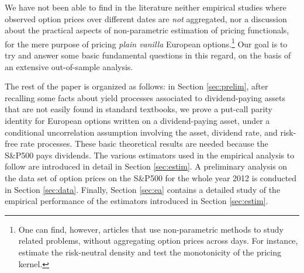 \documentclass[11pt]{article}
\theoremstyle{remark}
\begin{document}
We have not been able to find in the literature neither empirical
studies where observed option prices over different dates are
\emph{not} aggregated, nor a discussion about the practical aspects of
non-parametric estimation of pricing functionals, for the mere purpose
of pricing \emph{plain vanilla} European options.\footnote{One can
  find, however, articles that use non-parametric methods to study
  related problems, without aggregating option prices across days. For
  instance, \cite{JR96} estimate the risk-neutral density and
  \cite{Beare} test the monotonicity of the pricing kernel.} Our goal
is to try and answer some basic fundamental questions in this regard,
on the basis of an extensive out-of-sample analysis.


The rest of the paper is organized as follows: in Section
\ref{sec:prelim}, after recalling some facts about yield processes
associated to dividend-paying assets that are not easily found in
standard textbooks, we prove a put-call parity identity for European
options written on a dividend-paying asset, under a conditional
uncorrelation assumption involving the asset, dividend rate, and
risk-free rate processes. These basic theoretical results are needed
because the S\&P500 pays dividends. The various estimators used in the
empirical analysis to follow are introduced in detail in Section
\ref{sec:estim}. A preliminary analysis on the data set of option
prices on the S\&P500 for the whole year 2012 is conducted in Section
\ref{sec:data}. Finally, Section \ref{sec:ea} contains a detailed
study of the empirical performance of the estimators introduced in
Section \ref{sec:estim}.


\end{document}
